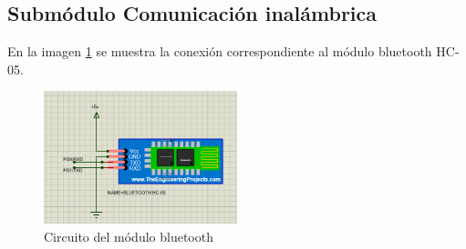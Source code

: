\subsection{Submódulo Comunicación inalámbrica}
En la imagen \ref{fig:CircuitoBlue} se muestra la conexión correspondiente al módulo bluetooth HC-05.

\begin{figure}[H]
	\centering
	\includegraphics[width=0.5\textwidth]{Capitulo4/hardware/images/CircuitoBluetooth}
	\caption{Circuito del módulo bluetooth}
	\label{fig:CircuitoBlue}
\end{figure}